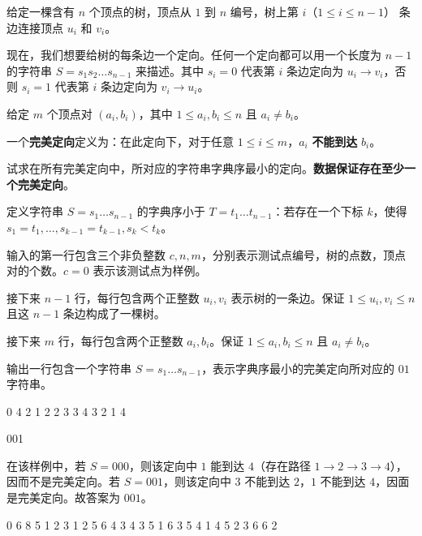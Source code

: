 \documentclass{oicontest-v2}
\begin{document}
\oicnextproblem %

\oicstatement

给定一棵含有 $n$ 个顶点的树，顶点从 $1$ 到 $n$ 编号，树上第 $i$（$1\leq i\leq n-1$） 条边连接顶点 $u_i$ 和 $v_i$。

现在，我们想要给树的每条边一个定向。任何一个定向都可以用一个长度为 $n-1$ 的字符串 $S=s_1s_2\ldots s_{n-1}$ 来描述。其中 $s_i=0$ 代表第 $i$ 条边定向为 $u_i \to v_i$，否则 $s_i=1$ 代表第 $i$ 条边定向为 $v_i\to u_i$。

给定 $m$ 个顶点对 $(a_i,b_i)$，其中 $1\leq a_i,b_i \leq n$ 且 $a_i\neq b_i$。

一个\textbf{完美定向}定义为：在此定向下，对于任意 $1\leq i\leq m$，$a_i$ \textbf{不能到达} $b_i$。

试求在所有完美定向中，所对应的字符串字典序最小的定向。\textbf{数据保证存在至少一个完美定向}。

定义字符串 $S=s_1\ldots s_{n-1}$ 的字典序小于 $T=t_1\ldots t_{n-1}$：若存在一个下标 $k$，使得 $s_1=t_1,\ldots,s_{k-1}=t_{k-1},s_k<t_k$。

\oicinputformat

输入的第一行包含三个非负整数 $c,n,m$，分别表示测试点编号，树的点数，顶点对的个数。$c=0$ 表示该测试点为样例。

接下来 $n-1$ 行，每行包含两个正整数 $u_i,v_i$ 表示树的一条边。保证 $1\leq u_i,v_i\leq n$ 且这 $n-1$ 条边构成了一棵树。

接下来 $m$ 行，每行包含两个正整数 $a_i,b_i$。保证 $1\leq a_i,b_i \leq n$ 且 $a_i\neq b_i$。

\oicoutputformat

输出一行包含一个字符串 $S=s_1\ldots s_{n-1}$，表示字典序最小的完美定向所对应的 $01$ 字符串。

\begin{oicsample}
0 4 2
1 2
2 3
3 4
3 2
1 4
\end{oicsample}

\begin{oicsample}
001
\end{oicsample}


在该样例中，若 $S=000$，则该定向中 $1$ 能到达 $4$（存在路径 $1\to 2\to 3\to 4$），因而不是完美定向。若 $S=001$，则该定向中 $3$ 不能到达 $2$，$1$ 不能到达 $4$，因面是完美定向。故答案为 $001$。

\begin{oicsample}
0 6 8
5 1
2 3
1 2
5 6
4 3
4 3
5 1
6 3
5 4
1 4
5 2
3 6
6 2
\end{oicsample}
\end{document}
